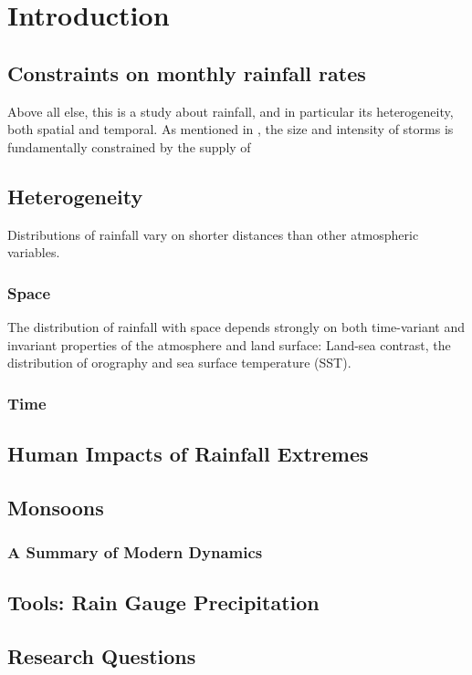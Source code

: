 \chapter{Introduction}

\section{Constraints on monthly rainfall rates}
Above all else, this is a study about rainfall, and in particular its heterogeneity, both spatial and temporal. As mentioned in \cite{Trenberth}, the size and intensity of storms is fundamentally constrained by the supply of 

\section{Heterogeneity}
Distributions of rainfall vary on shorter distances than other atmospheric variables.

\subsection{Space}
The distribution of rainfall with space depends strongly on both time-variant and invariant properties of the atmosphere and land surface: Land-sea contrast, the distribution of orography and sea surface temperature (SST).

\subsection{Time}
\section{Human Impacts of Rainfall Extremes}
\section{Monsoons}
\subsection{A Summary of Modern Dynamics}

\section{Tools: Rain Gauge Precipitation}

\section{Research Questions}

